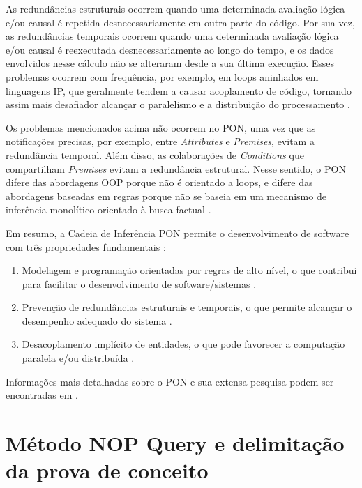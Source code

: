 As redundâncias estruturais ocorrem quando uma determinada avaliação lógica e/ou causal é repetida desnecessariamente em outra parte do código. 
Por sua vez, as redundâncias temporais ocorrem quando uma determinada avaliação lógica e/ou causal é reexecutada desnecessariamente ao longo do tempo, e os dados envolvidos nesse cálculo não se alteraram desde a sua última execução. 
Esses problemas ocorrem com frequência, por exemplo, em loops aninhados em linguagens IP, que geralmente tendem a causar acoplamento de código, tornando assim mais desafiador alcançar o paralelismo e a distribuição do processamento \citep{simao2009holoniccontrolmetamodel,ronszcka2015noprete,linhares2020}.

Os problemas mencionados acima não ocorrem no PON, uma vez que as notificações precisas, por exemplo, entre \textit{Attributes} e \textit{Premises}, evitam a redundância temporal. Além disso, as colaborações de \textit{Conditions} que compartilham \textit{Premises} evitam a redundância estrutural. 
Nesse sentido, o PON difere das abordagens OOP porque não é orientado a loops, e difere das abordagens baseadas em regras porque não se baseia em um mecanismo de inferência monolítico orientado à busca factual \citep{simao2009holoniccontrolmetamodel,simaostadzisz2008patentepon,ronszcka2015noprete,linhares2020}. 

Em resumo, a Cadeia de Inferência PON permite o desenvolvimento de software com três propriedades fundamentais \citep{linhares2020}: 
\begin{enumerate}
    \item Modelagem e programação orientadas por regras de alto nível, o que contribui para facilitar o desenvolvimento de software/sistemas \citep{Babu2022masters}.
    \item Prevenção de redundâncias estruturais e temporais, o que permite alcançar o desempenho adequado do sistema \citep{liao2018notification}.
    \item Desacoplamento implícito de entidades, o que pode favorecer a computação paralela e/ou distribuída \citep{kerschbaumer2018phdcircuitos}.
\end{enumerate}

Informações mais detalhadas sobre o PON e sua extensa pesquisa podem ser encontradas em \citep{neves2021application,linhares2020,schutz2018parallelizableneuralnop,simao2014evaluation}.




\section{Método NOP Query e delimitação da prova de conceito}
\label{sec:nop-query}

